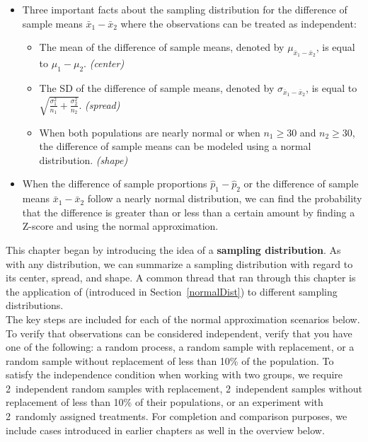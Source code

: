 \begin{itemize}
\item Three important facts about the sampling distribution for the difference of sample means $\bar{x}_1-\bar{x}_2$ where the observations can be treated as independent:
\begin{itemize}\vspace{-1mm}
  \setlength{\itemsep}{0mm}
  \item The mean of the difference of sample means, denoted by $\mu_{\bar{x}_1-\bar{x}_2}$, is equal to $\mu_1-\mu_2$. \textit{(center)}
  \item The SD of the difference of sample means, denoted by $\sigma_{\bar{x}_1-\bar{x}_2}$, is equal to $ \sqrt{\frac{\sigma_1^2}{n_1} + \frac{\sigma_2^2}{n_2}}$. \textit{(spread)}
  \item When both populations are nearly normal or when $n_1\ge 30$ and $n_2\ge 30$, the difference of sample means can be modeled using a normal distribution. \textit{(shape)}
\end{itemize}

\item When the difference of sample proportions $\hat{p}_1-\hat{p}_2 $ or the difference of sample means $\bar{x}_1-\bar{x}_2$ follow a nearly normal distribution, we can find the probability that the difference is greater than or less than a certain amount by finding a Z-score and using the normal approximation.  

\end{itemize}

{}

\reviewchapterheader{}
\newcommand{\chdistvertparagraphspace}{3mm}

\noindent This chapter began by introducing the idea of a \textbf{sampling distribution}.  As with any distribution, we can summarize a sampling distribution with regard to its center, spread, and shape.  A common thread that ran through this chapter is the application of  (introduced in Section~\ref{normalDist}) to different sampling distributions.\\[\chdistvertparagraphspace]
The key steps are included for each of the normal approximation scenarios below.  To verify that observations can be considered independent, verify that you have one of the following: a random process, a random sample with replacement, or a random sample without replacement of less than 10\% of the population.
To satisfy the independence condition when working with two groups, we require 2~independent random samples with replacement, 2~independent samples without replacement of less than 10\% of their populations, or an experiment with 2~randomly assigned treatments.
For completion and comparison purposes, we include cases introduced in earlier chapters as well in the overview below.

